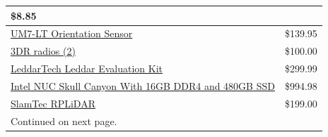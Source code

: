 \documentclass[compsoc,draftclsnofoot,onecolumn,10pt]{IEEEtran}
\begin{document}
\begin{table}[htbp]
{\begin{tabular}{|p{}|p{}|}
    {\$8.85}\\
    \hline
    {\href{http://www.chrobotics.com/shop/um7-lt-orientation-sensor}{UM7-LT Orientation Sensor}} &

    {\$139.95}\\
    \hline
    {\href{https://3dr.com/wp-content/uploads/2017/03/3DR-Radio-V2-doc1.pdf}{3DR radios (2)}} &

    {\$100.00}\\
    \hline
    {\href{http://Leddartech.com/Leddar-evaluation-kit/}{LeddarTech Leddar Evaluation Kit}} &

    {\$299.99}\\
    \hline
    {\href{http://www.intel.com/content/www/us/en/nuc/nuc-kit-nuc6i7kyk-features-configurations.html}{Intel NUC Skull Canyon \newline With 16GB DDR4 and 480GB SSD}} &

    {\$994.98}\\
    \hline
    {\href{https://www.slamtec.com/en/LiDAR}{SlamTec RPLiDAR}} &

    {\$199.00}\\
    \hline
    {Continued on next page.} &

     \\
    \hline

    \end{tabular}
    }
    \end{table}
\end{document}
